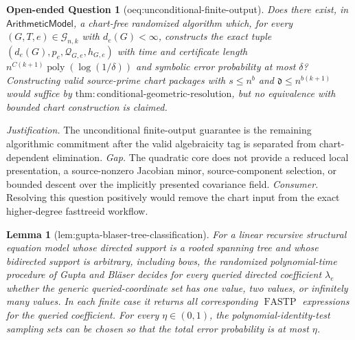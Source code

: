 \documentclass{article}
\newtheorem{lemma}{Lemma}
\newtheorem{openendedquestion}{Open-ended Question}
\begin{document}
\begin{openendedquestion}[oeq:unconditional-finite-output]\label{oeq:unconditional-finite-output}
Does there exist, in \(\mathsf{ArithmeticModel}\), a chart-free randomized algorithm which, for every \((G,T,e)\in\mathcal G_{n,k}\) with \(d_e(G)<\infty\), constructs the exact tuple \((d_e(G),p_e,\mathcal Q_{G,e},h_{G,e})\) with time and certificate length \(n^{C(k+1)}\operatorname{poly}(\log(1/\delta))\) and symbolic error probability at most \(\delta\)? Constructing valid source-prime chart packages with \(s\leq n^b\) and \(\mathfrak d\leq n^{b(k+1)}\) would suffice by \(\mathrm{thm:conditional\mbox{-}geometric\mbox{-}resolution}\), but no equivalence with bounded chart construction is claimed.
\end{openendedquestion}
\par\smallskip\noindent \textit{Justification.} The unconditional finite-output guarantee is the remaining algorithmic commitment after the valid algebraicity tag is separated from chart-dependent elimination. \textit{Gap.} The quadratic core does not provide a reduced local presentation, a source-nonzero Jacobian minor, source-component selection, or bounded descent over the implicitly presented covariance field. \textit{Consumer.} Resolving this question positively would remove the chart input from the exact higher-degree fasttreeid workflow.

\begin{lemma}[lem:gupta-blaser-tree-classification]\label{lem:gupta-blaser-tree-classification}
For a linear recursive structural equation model whose directed support is a rooted spanning tree and whose bidirected support is arbitrary, including bows, the randomized polynomial-time procedure of Gupta and Bl\"aser decides for every queried directed coefficient \(\lambda_e\) whether the generic queried-coordinate set has one value, two values, or infinitely many values. In each finite case it returns all corresponding \(\operatorname{FASTP}\) expressions for the queried coefficient. For every \(\eta\in(0,1)\), the polynomial-identity-test sampling sets can be chosen so that the total error probability is at most \(\eta\).
\end{lemma}
\end{document}
